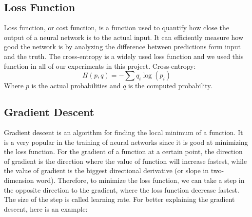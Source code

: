 \documentclass[]{UCD_CS_FYP_Report}
\begin{document}
\subsection{Loss Function}
Loss function, or cost function, is a function used to quantify how close the output of a neural network is to the actual input. It can efficiently measure how good the network is by analyzing the difference between predictions form input and the truth. The cross-entropy is a widely used loss function and we used this function in all of our experiments in this project.
Cross-entropy:
\begin{equation}
H\left(p,q\right)=-\sum q_i\log{\left(p_i\right)}
\end{equation}
Where $p$ is the actual probabilities and $q$ is the computed probability.
\subsection{Gradient Descent}
Gradient descent is an algorithm for finding the local minimum of a function. It is a very popular in the training of neural networks since it is good at minimizing the loss function. For the gradient of a function at a certain point, the direction of gradient is the direction where the value of function will increase fastest, while the value of gradient is the biggest directional derivative (or slope in two-dimension word). Therefore, to minimize the loss function, we can take a step in the opposite direction to the gradient, where the loss function decrease fastest. The size of the step is called learning rate. For better explaining the gradient descent, here is an example:
\end{document}
